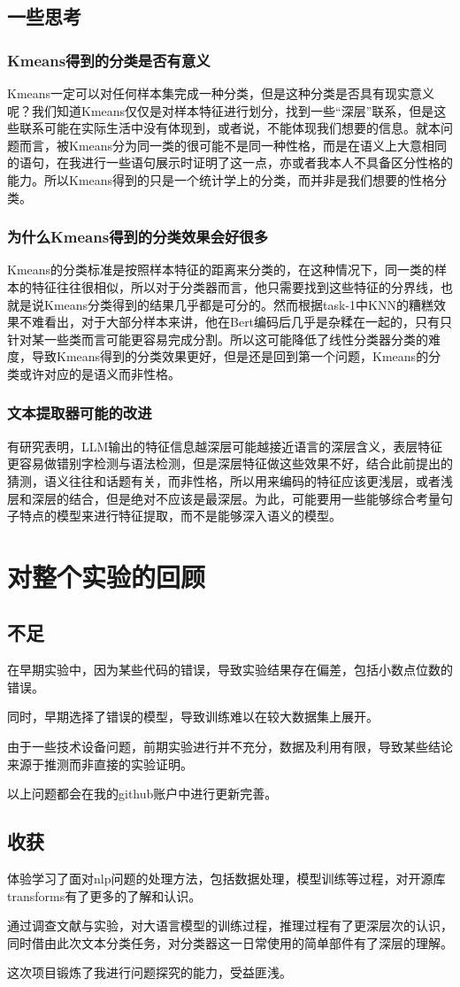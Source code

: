\documentclass{article}
\begin{document}
	\subsection{一些思考}
	\subsubsection{Kmeans得到的分类是否有意义}
	Kmeans一定可以对任何样本集完成一种分类，但是这种分类是否具有现实意义呢？我们知道Kmeans仅仅是对样本特征进行划分，找到一些“深层”联系，但是这些联系可能在实际生活中没有体现到，或者说，不能体现我们想要的信息。就本问题而言，被Kmeans分为同一类的很可能不是同一种性格，而是在语义上大意相同的语句，在我进行一些语句展示时证明了这一点，亦或者我本人不具备区分性格的能力。所以Kmeans得到的只是一个统计学上的分类，而并非是我们想要的性格分类。
	\subsubsection{为什么Kmeans得到的分类效果会好很多}
	Kmeans的分类标准是按照样本特征的距离来分类的，在这种情况下，同一类的样本的特征往往很相似，所以对于分类器而言，他只需要找到这些特征的分界线，也就是说Kmeans分类得到的结果几乎都是可分的。然而根据task-1中KNN的糟糕效果不难看出，对于大部分样本来讲，他在Bert编码后几乎是杂糅在一起的，只有只针对某一些类而言可能更容易完成分割。所以这可能降低了线性分类器分类的难度，导致Kmeans得到的分类效果更好，但是还是回到第一个问题，Kmeans的分类或许对应的是语义而非性格。
	\subsubsection{文本提取器可能的改进}
	有研究表明，LLM输出的特征信息越深层可能越接近语言的深层含义，表层特征更容易做错别字检测与语法检测，但是深层特征做这些效果不好，结合此前提出的猜测，语义往往和话题有关，而非性格，所以用来编码的特征应该更浅层，或者浅层和深层的结合，但是绝对不应该是最深层。为此，可能要用一些能够综合考量句子特点的模型来进行特征提取，而不是能够深入语义的模型。
	\section{对整个实验的回顾}
	\subsection{不足}
	在早期实验中，因为某些代码的错误，导致实验结果存在偏差，包括小数点位数的错误。
	
	同时，早期选择了错误的模型，导致训练难以在较大数据集上展开。
	
	由于一些技术设备问题，前期实验进行并不充分，数据及利用有限，导致某些结论来源于推测而非直接的实验证明。
	
	以上问题都会在我的github账户中进行更新完善。
	\subsection{收获}
	体验学习了面对nlp问题的处理方法，包括数据处理，模型训练等过程，对开源库transforms有了更多的了解和认识。
	
	通过调查文献与实验，对大语言模型的训练过程，推理过程有了更深层次的认识，同时借由此次文本分类任务，对分类器这一日常使用的简单部件有了深层的理解。
	
	这次项目锻炼了我进行问题探究的能力，受益匪浅。
\end{document}
